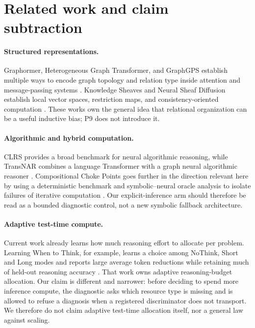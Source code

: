 \section{Related work and claim subtraction}

\paragraph{Structured representations.}
Graphormer, Heterogeneous Graph Transformer, and GraphGPS establish multiple ways to encode graph topology and relation type inside attention and message-passing systems \citep{ying2021graphormer,hu2020hgt,rampasek2022gps}. Knowledge Sheaves and Neural Sheaf Diffusion establish local vector spaces, restriction maps, and consistency-oriented computation \citep{gebhart2021knowledge,bodnar2022sheaf}. These works own the general idea that relational organization can be a useful inductive bias; P9 does not introduce it.

\paragraph{Algorithmic and hybrid computation.}
CLRS provides a broad benchmark for neural algorithmic reasoning, while TransNAR combines a language Transformer with a graph neural algorithmic reasoner \citep{velickovic2022clrs,bounsi2024transnar}. Compositional Choke Points goes further in the direction relevant here by using a deterministic benchmark and symbolic--neural oracle analysis to isolate failures of iterative computation \citep{anonymous2026chokepoints}. Our explicit-inference arm should therefore be read as a bounded diagnostic control, not a new symbolic fallback architecture.

\paragraph{Adaptive test-time compute.}
Current work already learns how much reasoning effort to allocate per problem. Learning When to Think, for example, learns a choice among NoThink, Short and Long modes and reports large average token reductions while retaining much of held-out reasoning accuracy \citep{kassenaar2026when}. That work owns adaptive reasoning-budget allocation. Our claim is different and narrower: before deciding to spend more inference compute, the diagnostic asks which resource type is missing and is allowed to refuse a diagnosis when a registered discriminator does not transport. We therefore do not claim adaptive test-time allocation itself, nor a general law against scaling.

